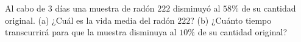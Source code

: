 \item Al cabo de $3$ días una muestra de radón $222$ disminuyó al $58\%$ de su cantidad original. (a) ¿Cuál es la vida media del radón $222$? (b) ¿Cuánto tiempo transcurrirá para que la muestra disminuya al $10\%$ de su cantidad original?
